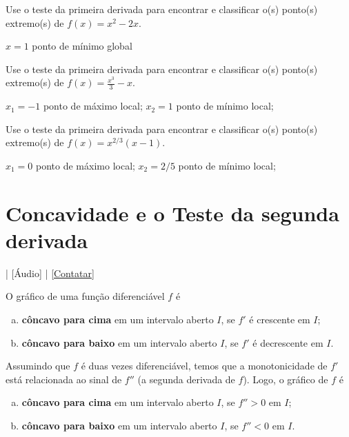\begin{exer}
  Use o teste da primeira derivada para encontrar e classificar o(s) ponto(s) extremo(s) de $f(x) = x^2 - 2x$.
\end{exer}
\begin{resp}
  $x=1$ ponto de mínimo global
\end{resp}

\begin{exer}
    Use o teste da primeira derivada para encontrar e classificar o(s) ponto(s) extremo(s) de $\displaystyle f(x) = \frac{x^3}{3}-x$.
\end{exer}
\begin{resp}
  $x_1=-1$ ponto de máximo local; $x_2=1$ ponto de mínimo local;
\end{resp}

\begin{exer}
  Use o teste da primeira derivada para encontrar e classificar o(s) ponto(s) extremo(s) de $\displaystyle f(x) = x^{2/3}(x-1)$.
\end{exer}
\begin{resp}
  $x_1=0$ ponto de máximo local; $x_2=2/5$ ponto de mínimo local;
\end{resp}


\section{Concavidade e o Teste da segunda derivada}\label{cap_apderiv_sec_tder2}

\begin{flushright}
  [Vídeo] | [Áudio] | \href{https://phkonzen.github.io/notas/contato.html}{[Contatar]}
\end{flushright}

O gráfico de uma função diferenciável $f$ é
\begin{enumerate}[a)]
\item {\bf côncavo para cima} em um intervalo aberto $I$, se $f'$ é crescente em $I$;
\item {\bf côncavo para baixo} em um intervalo aberto $I$, se $f'$ é decrescente em $I$.
\end{enumerate}

Assumindo que $f$ é duas vezes diferenciável, temos que a monotonicidade de $f'$ está relacionada ao sinal de $f''$ (a segunda derivada de $f$). Logo, o gráfico de $f$ é
\begin{enumerate}[a)]
\item {\bf côncavo para cima} em um intervalo aberto $I$, se $f'' > 0$ em $I$;
\item {\bf côncavo para baixo} em um intervalo aberto $I$, se $f'' < 0$ em $I$.
\end{enumerate}

